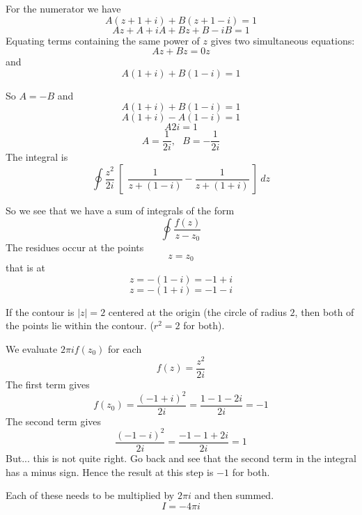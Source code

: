 \documentclass[11pt, oneside]{article}   	%
\begin{document}
For the numerator we have
\[ A(z + 1 + i) + B(z + 1 - i) = 1 \]
\[ Az + A + iA + Bz + B - iB = 1 \]
Equating terms containing the same power of $z$ gives two simultaneous equations:
\[ Az + Bz = 0z \]
and
\[ A(1 + i) + B(1 - i) = 1 \]

So $A = -B$ and
\[ A(1 + i) + B(1 - i) = 1 \]
\[ A (1 + i) - A(1 - i) = 1 \]
\[ A 2i = 1 \]
\[ A = \frac{1}{2i}, \ \ \ B = -\frac{1}{2i} \]
The integral is
\[ \oint \frac{z^2}{2i} \ [ \ \ \frac{1}{z + (1 - i)} -  \frac{1}{z + (1 + i)} \ ] \ dz \]

So we see that we have a sum of integrals of the form
\[ \oint \frac{f(z)}{z - z_0} \]
The residues occur at the points
\[ z = z_0 \]
that is at 
\[ z = - (1 - i) = -1 + i \]
\[ z = - (1 + i) = -1 - i \]

If the contour is $|z| = 2$ centered at the origin (the circle of radius $2$, then both of the points lie within the contour.  ($ r^2 = 2$ for both).

We evaluate $2 \pi i f(z_0)$ for each
\[ f(z) = \frac{z^2}{2i} \]
The first term gives
\[ f(z_0) = \frac{(-1 + i)^2}{2i} =  \frac{1 - 1 - 2i}{2i} = -1 \]
The second term gives 
\[ \frac{(-1 -i)^2}{2i} = \frac{-1 - 1 + 2i}{2i} = 1 \]
But...  this is not quite right.  Go back and see that the second term in the integral has a minus sign.  Hence the result at this step is $-1$ for both.

Each of these needs to be multiplied by $2 \pi i$ and then summed.
\[ I = -4 \pi i \]
\end{document}
